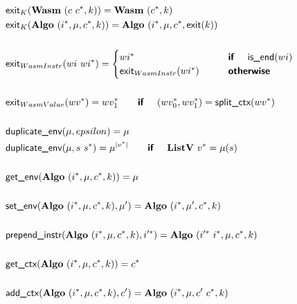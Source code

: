 \begin{align*}
  &\exit_{K}(\wasm ~ (c ~ \seq{c}, k)) = \wasm ~ (\seq{c}, k) \\
  &\exit_{K}(\algo ~ (\seq i, \mu, \seq c, k)) = \algo ~ (\seq i, \mu, \seq c, \exit(k)) \\
%
\newline \\
  &\exit_{WasmInstr}(wi ~ \seq{wi}) =
    \begin{cases}
      \seq{wi} &\quad\quad \premise{if}\quad ~ \helper{is\_end}(wi) \\
      \exit_{WasmInstr}(\seq{wi}) &\quad\quad \premise{otherwise} \\
    \end{cases}
  \\
%
\newline \\
  &\exit_{WasmValue}(\seq{wv}) = \seq{wv_1}
  \quad\quad\premise{if}\quad ~ (\seq{wv_0}, \seq{wv_1}) = \splitctx(\seq{wv}) \\
%
\newline \\
  &\duplicateenv(\mu, epsilon) = \mu \\
  &\duplicateenv(\mu, s ~ \seq{s}) = \mu^{|\seq v|}
  \quad\quad\premise{if}\quad ~ \listv ~ \seq v = \mu(s) \\
%
\newline \\
  &\getenv(\algo ~ (\seq i, \mu, \seq c, k)) = \mu \\
%
\newline \\
  &\setenv(\algo ~ (\seq i, \mu, \seq c, k), \mu') = \algo ~ (\seq i, \mu', \seq c, k) \\
%
\newline \\
  &\prependinstr(\algo ~ (\seq i, \mu, \seq c, k), \seq{i'}) = \algo ~ (\seq{i'} ~ \seq i, \mu, \seq c, k) \\
%
\newline \\
  &\getctx(\algo ~ (\seq i, \mu, \seq c, k)) = \seq c \\
%
\newline \\
  &\addctx(\algo ~ (\seq i, \mu, \seq c, k), c') = \algo ~ (\seq i, \mu, c' ~ \seq c, k) \\
%

\end{align*}
